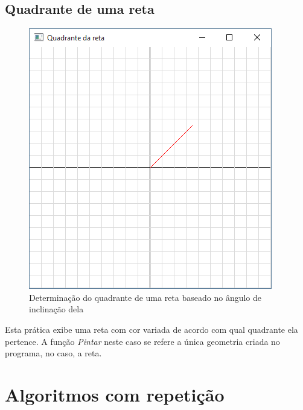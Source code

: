 





\section{Quadrante de uma reta}
\begin{figure}[ht]
  \centerline{\includegraphics[width=.5\textwidth]{img/cap1_ex4.png}}
  \caption{Determinação do quadrante de uma reta baseado no ângulo de inclinação dela}
  \label{fig:cap01_ex4}
\end{figure}
Esta prática exibe uma reta com cor variada de acordo com qual quadrante ela pertence. A função \emph{Pintar} neste caso se refere a única geometria criada no programa, no caso, a reta.



\chapter[Algoritmos com repetição]
{Algoritmos com repetição}



